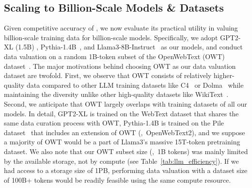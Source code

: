 \subsection{Scaling to Billion-Scale Models \& Datasets}
\label{sec:llm}
Given competitive accuracy of \method, we now evaluate its practical utility in valuing billion-scale training data for billion-scale models. Specifically, we adopt GPT2-XL (1.5B) \cite{radford2019language}, Pythia-1.4B~\cite{biderman2023pythia}, and Llama3-8B-Instruct~\cite{llama3modelcard} as our models, and conduct data valuation on a random 1B-token subset of the OpenWebText (OWT) dataset~\cite{gokaslan2019openwebtext}. The major motivations behind choosing OWT as our data valuation dataset are twofold. First, we observe that OWT consists of relatively higher-quality data compared to other LLM training datasets like C4~\cite{raffel2020exploring} or Dolma~\cite{soldaini2024dolma} while maintaining the diversity unlike other high-quality datasets like WikiText~\cite{merity2016pointer}. Second, we anticipate that OWT largely overlaps with training datasets of all our models. In detail, GPT2-XL is trained on the WebText dataset that shares the same data curation process with OWT, Pythia-1.4B is trained on the Pile dataset~\cite{gao2020pile} that includes an extension of OWT (\ie,\ OpenWebText2), and we suppose a majority of OWT would be a part of Llama3's massive 15T-token pretraining dataset. We also note that our OWT subset size (\ie,\ 1B tokens) was mainly limited by the available storage, not by compute (see Table~\ref{tab:llm_efficiency}). If we had access to a storage size of 1PB, performing data valuation with a dataset size of 100B+ tokens would be readily feasible using the same compute resource.

